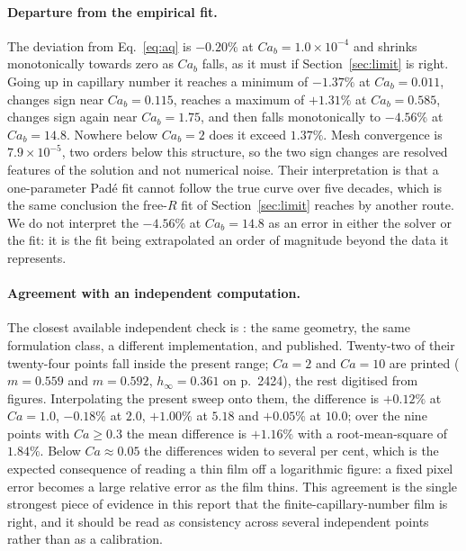 \documentclass[11pt,a4paper]{article}
\begin{document}
\paragraph{Departure from the empirical fit.} The deviation from
Eq.~\eqref{eq:aq} is $-0.20\%$ at $Ca_b=1.0\times10^{-4}$ and shrinks
monotonically towards zero as $Ca_b$ falls, as it must if
Section~\ref{sec:limit} is right. Going up in capillary number it reaches a
minimum of $-1.37\%$ at $Ca_b=0.011$, changes sign near $Ca_b=0.115$, reaches a
maximum of $+1.31\%$ at $Ca_b=0.585$, changes sign again near $Ca_b=1.75$, and
then falls monotonically to $-4.56\%$ at $Ca_b=14.8$. Nowhere below $Ca_b=2$
does it exceed $1.37\%$. Mesh convergence is $7.9\times10^{-5}$, two orders below
this structure, so the two sign changes are resolved features of the solution
and not numerical noise. Their interpretation is that a one-parameter Pad\'e
fit cannot follow the true curve over five decades, which is the same
conclusion the free-$R$ fit of Section~\ref{sec:limit} reaches by another
route. We do not interpret the $-4.56\%$ at $Ca_b=14.8$ as an error in either
the solver or the fit: it is the fit being extrapolated an order of magnitude
beyond the data it represents.

\paragraph{Agreement with an independent computation.} The closest available
independent check is \citet{giavedoni1997axisymmetric}: the same geometry, the
same formulation class, a different implementation, and published. Twenty-two
of their twenty-four points fall inside the present range; $Ca=2$ and $Ca=10$
are printed ($m=0.559$ and $m=0.592$, $h_\infty=0.361$ on p.~2424), the rest
digitised from figures.
Interpolating the present sweep onto them, the difference is $+0.12\%$ at
$Ca=1.0$, $-0.18\%$ at $2.0$, $+1.00\%$ at $5.18$ and $+0.05\%$ at $10.0$;
over the nine points with $Ca\ge0.3$ the mean difference is $+1.16\%$ with a
root-mean-square of $1.84\%$. Below $Ca\approx0.05$ the differences widen to
several per cent, which is the expected consequence of reading a thin film off
a logarithmic figure: a fixed pixel error becomes a large relative error as the
film thins. This agreement is the single strongest piece of evidence in this
report that the finite-capillary-number film is right, and it should be read as
consistency across several independent points rather than as a calibration.
\end{document}
